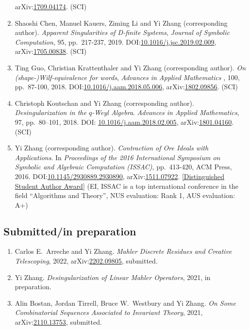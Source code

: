 \documentclass[a4paper,12pt]{article}
\begin{document}
\begin{enumerate}
 arXiv:\href{https://arxiv.org/abs/1709.04174}{1709.04174}. (SCI)
  \item Shaoshi Chen, Manuel Kauers, Ziming Li and Yi Zhang (corresponding author). {\em Apparent Singularities of D-finite Systems}, 
 {\em  Journal of Symbolic Computation},  95, pp.\ 217-237, 2019. DOI:\href{https://doi.org/10.1016/j.jsc.2019.02.009}{10.1016/j.jsc.2019.02.009}, arXiv:\href{http://arxiv.org/abs/1705.00838}{1705.00838}. (SCI)
\item Ting Guo, Christian Krattenthaler and Yi Zhang (corresponding author).
{\em On (shape-)Wilf-equivalence for words}, 
{\em  Advances in Applied Mathematics} , 100, pp.\ 87-100, 2018. 
DOI:\href{https://doi.org/10.1016/j.aam.2018.05.006}{10.1016/j.aam.2018.05.006}, 
arXiv:\href{https://arxiv.org/pdf/1802.09856.pdf}{1802.09856}. (SCI)
\item Christoph Koutschan and Yi Zhang (corresponding author). {\em Desingularization in the $q$-Weyl Algebra}. 
{\em Advances in Applied Mathematics}, 97, pp.\ 80–101, 2018. 
DOI: \href{http://dx.doi.org/10.1016/j.aam.2018.02.005}{10.1016/j.aam.2018.02.005},
arXiv:\href{https://arxiv.org/abs/1801.04160}{1801.04160}. (SCI) 
\item Yi Zhang (corresponding author). {\em Contraction of Ore Ideals with Applications}. 
In {\em Proceedings of the 2016 International Symposium on Symbolic and Algebraic Computation (ISSAC)}, 
pp.\ 413-420, ACM Press, 2016. DOI:\href{http://dl.acm.org/citation.cfm?id=2930890}{10.1145/2930889.2930890},
arXiv:\href{https://arxiv.org/abs/1511.07922}{1511.07922}. 
\href{https://www.sigsam.org/Awards/ISSACAwards.html}{[Distinguished Student Author Award]} 
(EI, ISSAC is a top international conference in the field ``Algorithms and Theory'', NUS evaluation: Rank 1, AUS evaluation: A+) 
\end{enumerate}

\subsection*{Submitted/in preparation}
\begin{enumerate}
\item Carlos E.\ Arreche and Yi Zhang. 
{\em Mahler Discrete Residues and Creative Telescoping}, 2022, arXiv:\href{https://arxiv.org/abs/2202.09805}{2202.09805}, submitted. 
\item Yi Zhang. 
{\em Desingularization of Linear Mahler Operators}, 2021, in preparation.
\item Alin Bostan, Jordan Tirrell, Bruce W.\ Westbury and Yi Zhang. 
{\em On Some Combinatorial Sequences Associated to Invariant Theory}, 2021, arXiv:\href{https://arxiv.org/abs/2110.13753}{2110.13753}, submitted. 
\end{enumerate}
\end{document}
